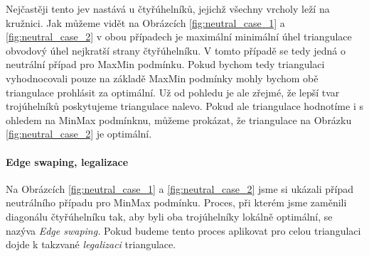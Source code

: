 \documentclass[12pt,a4paper]{article}
\begin{document}
\begin{figure}[h!]
\centering
\begin{floatrow}
\end{floatrow}
\end{figure}
Nejčastěji tento jev nastává u čtyřúhelníků, jejichž všechny vrcholy leží na kružnici. Jak můžeme vidět na Obrázcích \ref{fig:neutral_case_1} a \ref{fig:neutral_case_2} v obou případech je maximální minimální úhel triangulace obvodový úhel nejkratší strany čtyřúhelníku. V tomto případě se tedy jedná o neutrální případ pro MaxMin podmínku. Pokud bychom tedy triangulaci vyhodnocovali pouze na základě MaxMin podmínky mohly bychom obě triangulace prohlásit za optimální. Už od pohledu je ale zřejmé, že lepší tvar trojúhelníků poskytujeme triangulace nalevo. Pokud ale triangulace hodnotíme i s ohledem na MinMax podmínknu, můžeme prokázat, že triangulace na Obrázku \ref{fig:neutral_case_2} je optimální.

\paragraph{Edge swaping, legalizace}
Na Obrázcích \ref{fig:neutral_case_1} a \ref{fig:neutral_case_2} jsme si ukázali případ neutrálního případu pro MinMax podmínku. Proces, při kterém jsme zaměnili diagonálu čtyřúhelníku tak, aby byli oba trojúhelníky lokálně optimální, se nazýva \textit{Edge swaping.} Pokud budeme tento proces aplikovat pro celou triangulaci dojde k takzvané \textit{legalizaci} triangulace.
\end{document}
